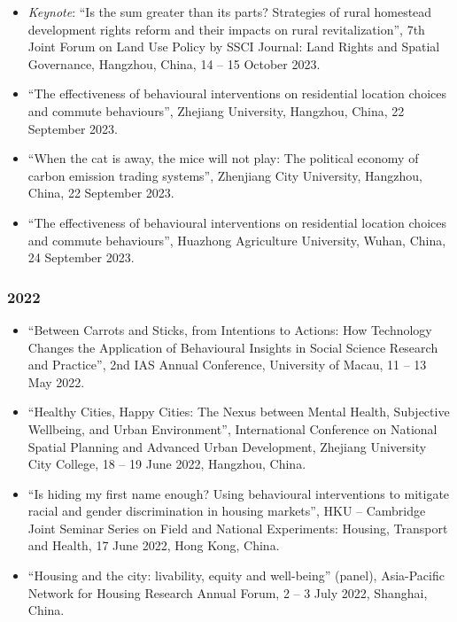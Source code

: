 \documentclass[11pt,a4paper]{article}
\providecommand{\tightlist}{%
  \setlength{\itemsep}{1pt}\setlength{\parskip}{0pt}}
\begin{document}
\begin{itemize}
\tightlist
\item
  \emph{Keynote}: ``Is the sum greater than its parts? Strategies of
  rural homestead development rights reform and their impacts on rural
  revitalization'', 7th Joint Forum on Land Use Policy by SSCI Journal:
  Land Rights and Spatial Governance, Hangzhou, China, 14 -- 15 October
  2023.
\item
  ``The effectiveness of behavioural interventions on residential
  location choices and commute behaviours'', Zhejiang University,
  Hangzhou, China, 22 September 2023.
\item
  ``When the cat is away, the mice will not play: The political economy
  of carbon emission trading systems'', Zhenjiang City University,
  Hangzhou, China, 22 September 2023.
\item
  ``The effectiveness of behavioural interventions on residential
  location choices and commute behaviours'', Huazhong Agriculture
  University, Wuhan, China, 24 September 2023.
\end{itemize}

\subsubsection{2022}\label{section-23}

\begin{itemize}
\tightlist
\item
  ``Between Carrots and Sticks, from Intentions to Actions: How
  Technology Changes the Application of Behavioural Insights in Social
  Science Research and Practice'', 2nd IAS Annual Conference, University
  of Macau, 11 -- 13 May 2022.
\item
  ``Healthy Cities, Happy Cities: The Nexus between Mental Health,
  Subjective Wellbeing, and Urban Environment'', International
  Conference on National Spatial Planning and Advanced Urban
  Development, Zhejiang University City College, 18 -- 19 June 2022,
  Hangzhou, China.
\item
  ``Is hiding my first name enough? Using behavioural interventions to
  mitigate racial and gender discrimination in housing markets'', HKU --
  Cambridge Joint Seminar Series on Field and National Experiments:
  Housing, Transport and Health, 17 June 2022, Hong Kong, China.
\item
  ``Housing and the city: livability, equity and well-being'' (panel),
  Asia-Pacific Network for Housing Research Annual Forum, 2 -- 3 July
  2022, Shanghai, China.
\end{itemize}
\end{document}
